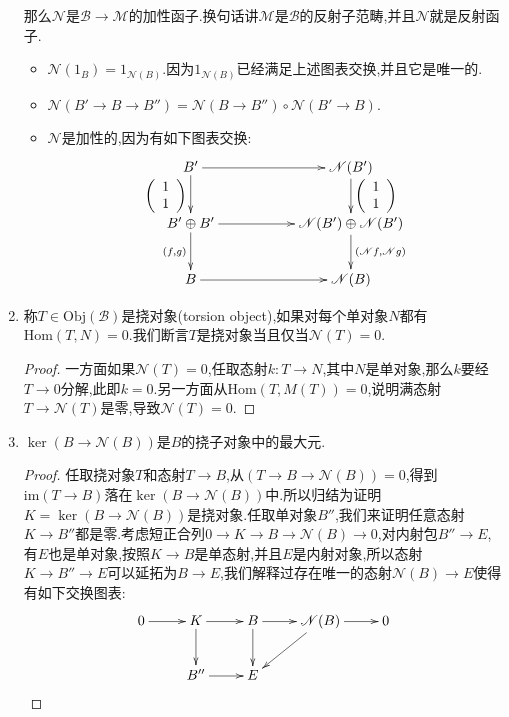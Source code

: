 \begin{enumerate}
    那么$\mathscr{N}$是$\mathscr{B}\to\mathscr{M}$的加性函子.换句话讲$\mathscr{M}$是$\mathscr{B}$的反射子范畴,并且$\mathscr{N}$就是反射函子.
    \begin{itemize}
    	\item $\mathscr{N}(1_B)=1_{\mathscr{N}(B)}$.因为$1_{\mathscr{N}(B)}$已经满足上述图表交换,并且它是唯一的.
    	\item $\mathscr{N}(B'\to B\to B'')=\mathscr{N}(B\to B'')\circ\mathscr{N}(B'\to B)$.
    	\item $\mathscr{N}$是加性的,因为有如下图表交换:
    	$$\xymatrix{B'\ar[rr]\ar[d]_{\left(\begin{array}{c}1\\1\end{array}\right)}&&\mathscr{N}(B')\ar[d]^{\left(\begin{array}{c}1\\1\end{array}\right)}\\B'\oplus B'\ar[rr]\ar[d]_{\left(f,g\right)}&&\mathscr{N}(B')\oplus\mathscr{N}(B')\ar[d]^{\left(\mathscr{N}f,\mathscr{N}g\right)}\\B\ar[rr]&&\mathscr{N}(B)}$$
    \end{itemize}
    \item 称$T\in\mathrm{Obj}(\mathscr{B})$是挠对象(torsion object),如果对每个单对象$N$都有$\mathrm{Hom}(T,N)=0$.我们断言$T$是挠对象当且仅当$\mathscr{N}(T)=0$.
    \begin{proof}
    	
    	一方面如果$\mathscr{N}(T)=0$,任取态射$k:T\to N$,其中$N$是单对象,那么$k$要经$T\to0$分解,此即$k=0$.另一方面从$\mathrm{Hom}(T,M(T))=0$,说明满态射$T\to\mathscr{N}(T)$是零,导致$\mathscr{N}(T)=0$.
    \end{proof}
    \item $\ker(B\to\mathscr{N}(B))$是$B$的挠子对象中的最大元.
    \begin{proof}
    	
    	任取挠对象$T$和态射$T\to B$,从$\left(T\to B\to\mathscr{N}(B)\right)=0$,得到$\mathrm{im}(T\to B)$落在$\ker(B\to\mathscr{N}(B))$中.所以归结为证明$K=\ker(B\to\mathscr{N}(B))$是挠对象.任取单对象$B''$,我们来证明任意态射$K\to B''$都是零.考虑短正合列$0\to K\to B\to\mathscr{N}(B)\to0$,对内射包$B''\to E$,有$E$也是单对象,按照$K\to B$是单态射,并且$E$是内射对象,所以态射$K\to B''\to E$可以延拓为$B\to E$,我们解释过存在唯一的态射$\mathscr{N}(B)\to E$使得有如下交换图表:
    	$$\xymatrix{0\ar[r]&K\ar[r]\ar[d]&B\ar[r]\ar[d]&\mathscr{N}(B)\ar[r]\ar[dl]&0\\&B''\ar[r]&E&&}$$
    	

\end{proof}
\end{enumerate}
